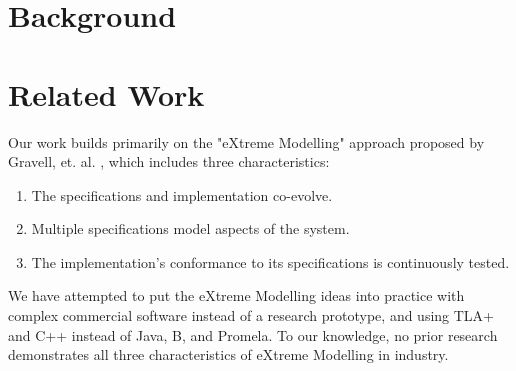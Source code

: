 \documentclass{vldb}
\begin{document}
\section{Background}
\label{sec:background}


\section{Related Work}
\label{sec:related_work}

Our work builds primarily on the "eXtreme Modelling" approach proposed by Gravell, et. al. \cite{Gravell11ConcurrentDevelopmentOfModelAndImplementation}, which includes three characteristics:

\begin{enumerate}
\item The specifications and implementation co-evolve.
\item Multiple specifications model aspects of the system.
\item The implementation's conformance to its specifications is continuously tested.
\end{enumerate}


We have attempted to put the eXtreme Modelling ideas into practice with complex commercial software instead of a research prototype, and using TLA+ and C++ instead of Java, B, and Promela. To our knowledge, no prior research demonstrates all three characteristics of eXtreme Modelling in industry.
\end{document}
